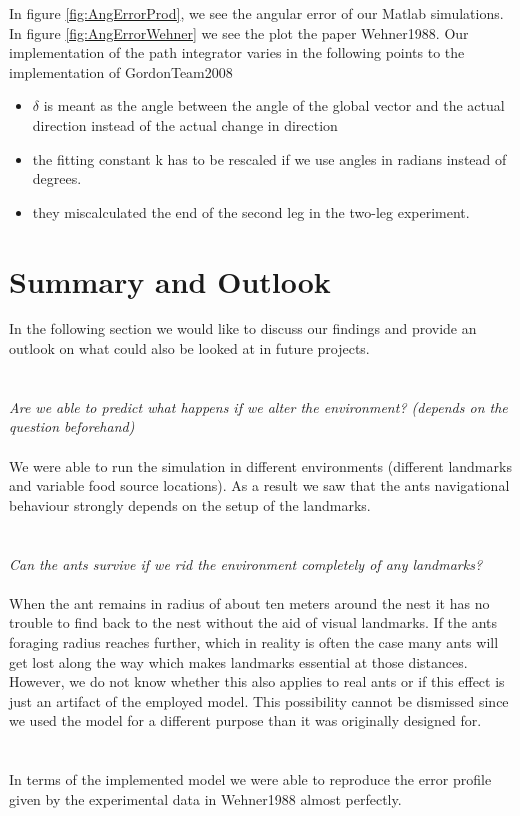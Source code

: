 \documentclass[11pt]{article}
\begin{document}
In figure \ref{fig:AngErrorProd}, we see the angular error of our Matlab simulations. In figure \ref{fig:AngErrorWehner} we see the plot the paper Wehner1988\cite{Wehner1988}. Our implementation of the path integrator varies in the following points to the implementation of GordonTeam2008 \cite{GordonTeam2008}

\begin{itemize}
\item $\delta$ is meant as the angle between the angle of the global vector and the actual direction instead of the actual change in direction
\item the fitting constant k has to be rescaled if we use angles in radians instead of degrees.
\item they miscalculated the end of the second leg in the two-leg experiment.
\end{itemize}




\section{Summary and Outlook}
In the following section we would like to discuss our findings and provide an outlook on what could also be looked at in future projects.\\
\\ \\
\textit{Are we able to predict what happens if we alter the environment? (depends on the question beforehand) } \\ \\
We were able to run the simulation in different environments (different landmarks and variable food source locations). As a result we saw that the ants navigational behaviour strongly depends on the setup of the landmarks.
\\ \\ \\
\textit{Can the ants survive if we rid the environment completely of any landmarks?}
\\ \\
When the ant remains in radius of about ten meters around the nest it has no trouble to find back to the nest without the aid of visual landmarks. If the ants foraging radius reaches further, which in reality is often the case many ants will get lost along the way which makes landmarks essential at those distances. However, we do not know whether this also applies to real ants or if this effect is just an artifact of the employed model. This possibility cannot be dismissed since we used the model for a different purpose than it was originally designed for.
\\ \\ \\
In terms of the implemented model we were able to reproduce the error profile given by the experimental data in Wehner1988 \cite{Wehner1988} almost perfectly.
\end{document}
